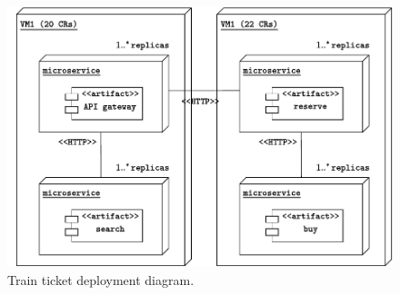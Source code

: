 \begin{figure}[!htp]
    \centering
    \includegraphics[width=\textwidth]{img/train-ticket-system-2.pdf}
    \caption{Train ticket deployment diagram.}
    \label{fig: train ticket deployment diagram}
\end{figure}

